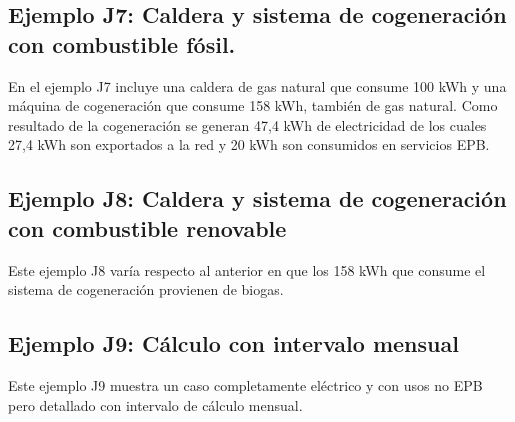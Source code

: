 \documentclass[10pt,notitlepage,oneside,a4paper]{article}
\begin{document}
\subsection{Ejemplo J7: Caldera y sistema de cogeneración con combustible fósil.}
En el ejemplo J7 incluye una caldera de gas natural que consume 100 kWh y una máquina de cogeneración que consume 158 kWh, también de gas natural. Como resultado de la cogeneración se generan 47,4 kWh de electricidad de los cuales 27,4 kWh son exportados a la red y 20 kWh son consumidos en servicios EPB.





\subsection{Ejemplo J8: Caldera y sistema de cogeneración con combustible renovable}
Este ejemplo J8 varía respecto al anterior en que los 158 kWh que consume el sistema de cogeneración provienen de biogas.





\subsection{Ejemplo J9: Cálculo con intervalo mensual}
Este ejemplo J9 muestra un caso completamente eléctrico y con usos no EPB pero detallado con intervalo de cálculo mensual.




\end{document}
